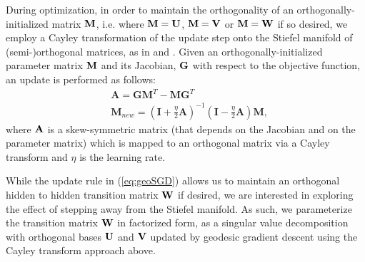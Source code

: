 \documentclass{article} %
\begin{document}


During optimization, in order to maintain the orthogonality of an orthogonally-initialized matrix $\bf{M}$, i.e. where $\bf{M}= \bf{U}$, $\bf{M}= \bf{V}$ or $\bf{M}= \bf{W}$ if so desired, we employ a Cayley transformation of the update step onto the Stiefel manifold of (semi-)orthogonal matrices, as in \citet{nishimori2005note} and \citet{tagare2011notes}. Given an orthogonally-initialized parameter matrix $\bf{M}$ and its Jacobian, $\bf{G}$ with respect to the objective function, an update is performed as follows:
\begin{equation}\label{eq:geoSGD}
\begin{aligned}
&\mathbf{A} = \mathbf{G}\mathbf{M}^T - \mathbf{M}\mathbf{G}^T\\
&\mathbf{M}_{new} = (\mathbf{I}+\frac{\eta}{2} \mathbf{A})^{-1}(\mathbf{I}-\frac{\eta}{2} \mathbf{A}) \mathbf{M},
\end{aligned}
\end{equation}
where $\bf{A}$ is a skew-symmetric matrix (that depends on the Jacobian and on the parameter matrix) which is mapped to an orthogonal matrix via a Cayley transform and ${\mathit{\eta}}$ is the learning rate.

While the update rule in (\ref{eq:geoSGD}) allows us to maintain an orthogonal hidden to hidden transition matrix $\bf{W}$ if desired, we are interested in exploring the effect of stepping away from the Stiefel manifold. As such, we parameterize the transition matrix $\bf{W}$ in factorized form, as a singular value decomposition with orthogonal bases $\bf{U}$ and $\bf{V}$ updated by geodesic gradient descent using the Cayley transform approach above.
%
%
\end{document}
